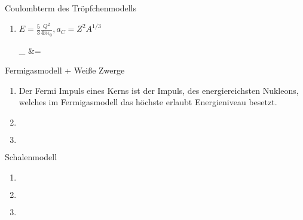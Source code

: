 \documentclass{alex_hü}
\begin{document}
\renewcommand{\labelenumi}{\alph{enumi})}


\begin{mybox}{Coulombterm des Tröpfchenmodells}
	\centering \(  \)
	\tcblower
	\begin{enumerate}
		\item \( E = \tfrac{5}{3}\tfrac{Q^2}{4\pi\epsilon_0}, a_C = Z^2 A^{1/3} \)
		\begin{flalign*}
			_{} &= 
		\end{flalign*}
	\end{enumerate}
\end{mybox}

\begin{mybox}{Fermigasmodell + Weiße Zwerge}
	\centering \(  \)
	\tcblower
	\begin{enumerate}
		\item Der Fermi Impuls eines Kerns ist der Impuls, des energiereichsten Nukleons, welches im Fermigasmodell das höchste erlaubt Energieniveau besetzt.
	\tcbline
		\item \(  \)
	\tcbline
		\item \(  \)
	\end{enumerate}
\end{mybox}

\begin{mybox}{Schalenmodell}
	\centering \(  \)
	\tcblower
	\begin{enumerate}
		\item \(  \)
	\tcbline
		\item \(  \)
	\tcbline
		\item \(  \)
	\end{enumerate}
\end{mybox}
\end{document}
